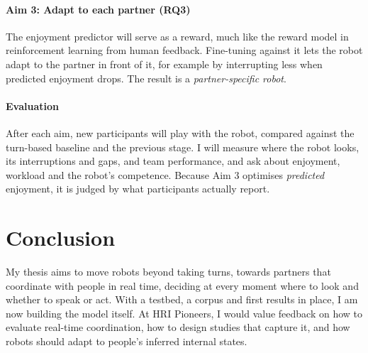 \documentclass[sigconf,review,anonymous,nonacm]{acmart}
\begin{document}
\paragraph{Aim 3: Adapt to each partner (RQ3)} The enjoyment predictor will serve as a reward, much like the reward model in reinforcement learning from human feedback. Fine-tuning against it lets the robot adapt to the partner in front of it, for example by interrupting less when predicted enjoyment drops. The result is a \emph{partner-specific robot}.

\paragraph{Evaluation} After each aim, new participants will play with the robot, compared against the turn-based baseline and the previous stage. I will measure where the robot looks, its interruptions and gaps, and team performance, and ask about enjoyment, workload and the robot's competence. Because Aim 3 optimises \emph{predicted} enjoyment, it is judged by what participants actually report.

\section{Conclusion}

My thesis aims to move robots beyond taking turns, towards partners that coordinate with people in real time, deciding at every moment where to look and whether to speak or act. With a testbed, a corpus and first results in place, I am now building the model itself. At HRI Pioneers, I would value feedback on how to evaluate real-time coordination, how to design studies that capture it, and how robots should adapt to people's inferred internal states.

\clearpage
\balance


\end{document}
